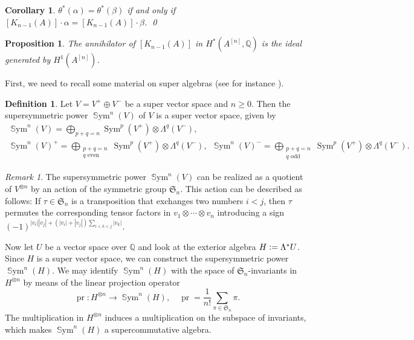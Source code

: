\documentclass{alggeom}
\DeclareMathOperator{\Sym}{Sym}
\DeclareMathOperator{\SSym}{\mathbb{S}ym}
\DeclareMathOperator{\pr}{pr}
\newcommand{\hilb}[1]{^{[#1]}}
\newcommand{\defIs}{\vcentcolon=}
\newcommand{\kum}[2]{K_{ #2 }( #1 )}
\newcommand{\Q}{\mathbb{Q}}
\theoremstyle{plain}
\newtheorem{proposition}[theorem]{Proposition}
\newtheorem{corollary}[theorem]{Corollary}
\theoremstyle{definition}
\newtheorem{definition}[theorem]{Definition}
\theoremstyle{remark}
\newtheorem{remark}[theorem]{Remark}
\begin{document}
\begin{corollary} \label{KummerEquality}
$\theta^*(\alpha) = \theta^*(\beta)$ if and only if $[\kum{A}{n-1}]\cdot \alpha = [\kum{A}{n-1}]\cdot \beta$. 
\qed
\end{corollary}

\begin{proposition}\label{Annihideal}
The annihilator of $[\kum{A}{n-1}]$ in $H^*(A\hilb{n},\Q)$ is the ideal generated by $H^1(A\hilb{n})$. 
\end{proposition}
First, we need to recall some material on super algebras (see for instance \cite{DeligneMorgan}).
\begin{definition}
Let $V=V^{+}\oplus V^{-}$ be a super vector space and $n\geq 0$. Then the supersymmetric power $\SSym^n(V)$ of $V$ is a super vector space, given by
\begin{gather*}
\SSym^n(V) = \bigoplus_{p+q=n} \Sym^p(V^{+}) \!\otimes\! \Lambda^q(V^{-}), \\
\SSym^n(V)^{+}\! =\! \bigoplus_{\substack{p+q=n \\ q\text{ even} }} \Sym^p(V^{+}) \!\otimes\! \Lambda^q(V^{-}), \ \ 
\SSym^n(V)^{-}\! =\! \bigoplus_{\substack{p+q=n \\ q\text{ odd} }} \Sym^p(V^{+}) \!\otimes\! \Lambda^q(V^{-}).
\end{gather*}
\end{definition}
\begin{remark}
The supersymmetric power $\SSym^n (V)$ can be realized as a quotient of $V^{\otimes n}$ by an action of the symmetric group $\mathfrak S_n$. This action can be described as follows: If $\tau\in \mathfrak S_n$ is a transposition that exchanges two numbers $i<j$, then $\tau$ permutes the corresponding tensor factors in $v_1\otimes  \cdots\otimes v_n$ introducing a sign
$(-1)^{|v_i||v_j|+(|v_i|+|v_j|)\sum_{i<k<j} |v_k|}$.
\end{remark}

Now let $U$ be a vector space over $\Q$ and look at the exterior algebra $H\defIs  \Lambda^* U$. 
Since $H$ is a super vector space, we can construct the supersymmetric power $ \SSym^n( H)$.
We may identify $\SSym^n( H)$ with the space of $\mathfrak S_n$-invariants in $H^{\otimes n}$ by means of the linear projection operator
$$
\pr : H^{\otimes n} \longrightarrow \SSym^n( H) , \quad \pr = \frac{1}{n!}\sum_{\pi \in\mathfrak S_n} \pi.
$$
The multiplication in $H^{\otimes n}$ induces a multiplication on the subspace of invariants, which makes $\SSym^n( H)$ a supercommutative algebra.
\end{document}
